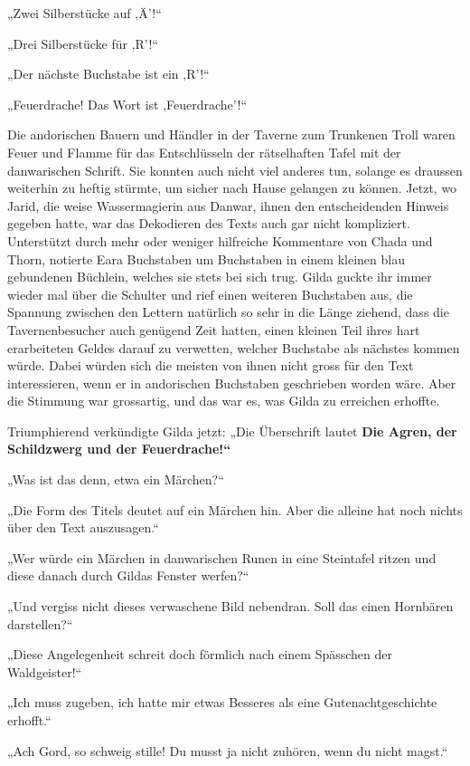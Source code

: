 \documentclass[10pt, a4paper, oneside]{book}
\begin{document}
„Zwei Silberstücke auf ‚Ä’!“

„Drei Silberstücke für ‚R’!“

„Der nächste Buchstabe ist ein ‚R’!“

„Feuerdrache! Das Wort ist ‚Feuerdrache’!“\bigskip



Die andorischen Bauern und Händler in der Taverne zum Trunkenen Troll waren Feuer und Flamme für das Entschlüsseln der rätselhaften Tafel mit der danwarischen Schrift. Sie konnten auch nicht viel anderes tun, solange es draussen weiterhin zu heftig stürmte, um sicher nach Hause gelangen zu können. Jetzt, wo Jarid, die weise Wassermagierin aus Danwar, ihnen den entscheidenden Hinweis gegeben hatte, war das Dekodieren des Texts auch gar nicht kompliziert. Unterstützt durch mehr oder weniger hilfreiche Kommentare von Chada und Thorn, notierte Eara Buchstaben um Buchstaben in einem kleinen blau gebundenen Büchlein, welches sie stets bei sich trug. Gilda guckte ihr immer wieder mal über die Schulter und rief einen weiteren Buchstaben aus, die Spannung zwischen den Lettern natürlich so sehr in die Länge ziehend, dass die Tavernenbesucher auch genügend Zeit hatten, einen kleinen Teil ihres hart erarbeiteten Geldes darauf zu verwetten, welcher Buchstabe als nächstes kommen würde. Dabei würden sich die meisten von ihnen nicht gross für den Text interessieren, wenn er in andorischen Buchstaben geschrieben worden wäre. Aber die Stimmung war grossartig, und das war es, was Gilda zu erreichen erhoffte.\bigskip



Triumphierend verkündigte Gilda jetzt: „Die Überschrift lautet \textbf{Die Agren, der Schildzwerg und der Feuerdrache!“}

„Was ist das denn, etwa ein Märchen?“

„Die Form des Titels deutet auf ein Märchen hin. Aber die alleine hat noch nichts über den Text auszusagen.“

„Wer würde ein Märchen in danwarischen Runen in eine Steintafel ritzen und diese danach durch Gildas Fenster werfen?“

„Und vergiss nicht dieses verwaschene Bild nebendran. Soll das einen Hornbären darstellen?“

„Diese Angelegenheit schreit doch förmlich nach einem Spässchen der Waldgeister!“

„Ich muss zugeben, ich hatte mir etwas Besseres als eine Gutenachtgeschichte erhofft.“

„Ach Gord, so schweig stille! Du musst ja nicht zuhören, wenn du nicht magst.“
\end{document}
